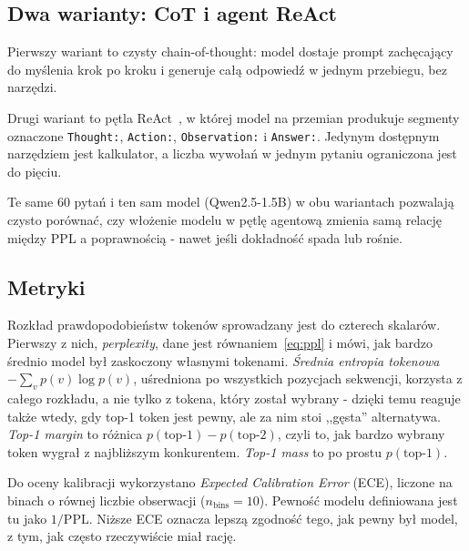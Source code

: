 \subsection{Dwa warianty: CoT i agent ReAct}
\label{sec:settings}

Pierwszy wariant to czysty chain-of-thought: model dostaje prompt
zachęcający do myślenia krok po kroku i generuje całą odpowiedź
w jednym przebiegu, bez narzędzi.

Drugi wariant to pętla ReAct~\cite{yao2023react}, w której model
na przemian produkuje segmenty oznaczone \texttt{Thought:},
\texttt{Action:}, \texttt{Observation:} i \texttt{Answer:}.
Jedynym dostępnym narzędziem jest kalkulator, a liczba wywołań
w jednym pytaniu ograniczona jest do pięciu.

Te same 60 pytań i ten sam model (Qwen2.5-1.5B) w obu wariantach
pozwalają czysto porównać, czy włożenie modelu w pętlę agentową
zmienia samą relację między PPL a poprawnością - nawet jeśli
dokładność spada lub rośnie.

\subsection{Metryki}
\label{sec:metryki}

Rozkład prawdopodobieństw tokenów sprowadzany jest do czterech
skalarów. Pierwszy z nich, \textit{perplexity}, dane jest
równaniem~\eqref{eq:ppl} i mówi, jak bardzo średnio model był
zaskoczony własnymi tokenami. \textit{Średnia entropia tokenowa}
$-\sum_v p(v)\log p(v)$, uśredniona po wszystkich pozycjach
sekwencji, korzysta z całego rozkładu, a nie tylko z tokena, który
został wybrany - dzięki temu reaguje także wtedy, gdy top-1 token
jest pewny, ale za nim stoi ,,gęsta'' alternatywa.
\textit{Top-1 margin} to różnica $p(\text{top-1}) - p(\text{top-2})$,
czyli to, jak bardzo wybrany token wygrał z najbliższym konkurentem.
\textit{Top-1 mass} to po prostu $p(\text{top-1})$.

Do oceny kalibracji wykorzystano \emph{Expected Calibration Error}
(ECE), liczone na binach o równej liczbie obserwacji
($n_{\text{bins}}=10$). Pewność modelu definiowana jest tu jako
$1/\mathrm{PPL}$. Niższe ECE oznacza lepszą zgodność tego, jak
pewny był model, z tym, jak często rzeczywiście miał rację.
